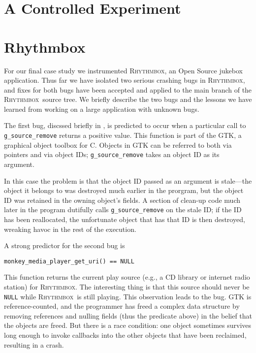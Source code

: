 \documentclass[draft]{sig-alternate}
\newcommand{\rhythmbox}{\textsc{Rhythmbox}\xspace}
\begin{document}
\section{A Controlled Experiment}
\label{sec:experiments:results}



\section{Rhythmbox}
\label{sec:rb}


For our final case study we instrumented \rhythmbox, an Open Source
jukebox application.  Thus far we have isolated two serious crashing
bugs in \rhythmbox, and fixes for both bugs have been accepted and
applied to the main branch of the \rhythmbox\ source tree.  We briefly
describe the two bugs and the lessons we have learned from working on
a large application with unknown bugs.

The first bug, discssed briefly in , is
predicted to occur when a particular call to {\tt g\_source\_remove}
returns a positive value.  This function is part of the GTK, a graphical
object toolbox for C.
Objects in GTK can be referred to both
via pointers and via object IDs; {\tt g\_source\_remove}
takes an object ID as its argument.

In this case the problem is that the object ID passed as an argument
is stale---the object it belongs to was destroyed much earlier in the
prorgram, but the object ID was retained in the owning object's fields.
A section of clean-up code much later in the program dutifully calls {\tt g\_source\_remove} on the
stale ID; if the ID has been reallocated, the unfortunate object that
has that ID is then destroyed, wreaking havoc in the rest of the execution.

A strong predictor for the second bug is 
\begin{verbatim}
monkey_media_player_get_uri() == NULL 
\end{verbatim} 
This function
returns the current play source (e.g., a CD library or internet radio
station) for \rhythmbox.  The interesting thing is that this source
should never be {\tt NULL} while \rhythmbox\ is still playing.  This
observation leads to the bug.  GTK is reference-counted, and the
programmer has freed a complex data structure by removing references
and nulling fields (thus the predicate above) in the belief that the objects are freed. But there
is a race condition: one object sometimes survives long enough to
invoke callbacks into the other objects that have been reclaimed,
resulting in a crash.
\end{document}
